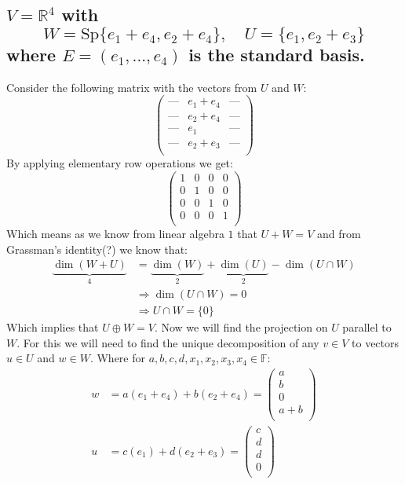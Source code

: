 \documentclass[11pt,a4paper]{article}
\theoremstyle{plain}
\newcommand{\R}{\mathbb{R}}
\newcommand{\F}{\mathbb{F}}
\begin{document}
	\subsection{$V = \R^4$ with 
	\[ W = \text{Sp}\{e_1+e_4,e_2+e_4\},\quad U = \{e_1,e_2+e_3\} \] 
	\noindent
	where $E = (e_1,...,e_4)$ is the standard basis.}
	Consider the following matrix with the vectors from $U$ and $W$:
	\[ \begin{pmatrix}
	\text{---} & e_1+e_4 & \text{---}\\
	\text{---} & e_2+e_4 & \text{---}\\
	\text{---} & e_1 & \text{---}\\
	\text{---} & e_2+e_3 & \text{---}\\
	\end{pmatrix} \]
	By applying elementary row operations we get:
	\[ \begin{pmatrix}
	1 & 0 & 0 & 0\\
	0 & 1 & 0 & 0\\
	0 & 0 & 1 & 0\\
	0 & 0 & 0 & 1\\
	\end{pmatrix} \]
	Which means as we know from linear algebra $1$ that $U + W = V$ and from
	Grassman's identity(?) we know that:
	\begin{align*}
		\underbrace{\dim(W+U)}_4 &= \underbrace{\dim(W)}_2
		+ \underbrace{\dim(U)}_2 - \dim(U\cap W) \\
		&\Rightarrow \dim(U\cap W) = 0 \\
		&\Rightarrow U\cap W = \{0\}
	\end{align*}
	Which implies that $U\oplus W = V$. Now we will find the projection on 
	$U$ parallel to $W$. For this we will need to find the unique decomposition
	of any $v\in V$ to vectors $u\in U$ and $w\in W$. Where for 
	$a,b,c,d,x_1,x_2,x_3,x_4\in\F$:
	\begin{align*}
		w &= a(e_1+e_4) + b(e_2+e_4) = 
		\begin{pmatrix}
	a\\
	b\\
	0\\
	a+b\\
		\end{pmatrix} \\
		u &= c(e_1) + d(e_2+e_3) = 
		\begin{pmatrix}
	c\\
	d\\
	d\\
	0\\
		\end{pmatrix} \\
	\end{align*}
\end{document}
